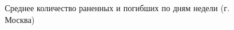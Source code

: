 \documentclass[a4paper, 14pt]{article}
\begin{document}
\begin{figure}[h]
	\caption{Среднее количество раненных и погибших по дням недели (г. Москва)}
\end{figure}





 




\newpage
\end{document}
